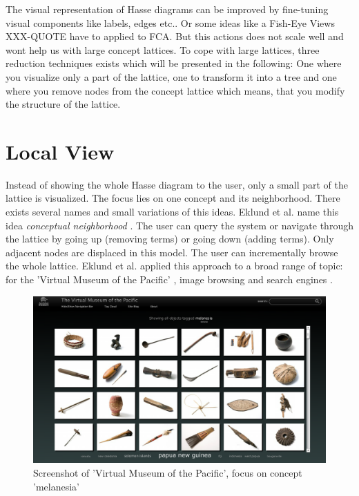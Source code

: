 \documentclass[11pt]{report}
\begin{document}
The visual representation of Hasse diagrams can be improved by fine-tuning visual components like labels, edges etc.. Or some ideas like a Fish-Eye Views XXX-QUOTE have to applied to FCA. But this actions does not scale well and wont help us with large concept lattices. To cope with large lattices, three reduction techniques exists which will be presented in the following: One where you visualize only a part of the lattice, one to transform it into a tree and one where you remove nodes from the concept lattice which means, that you modify the structure of the lattice.

\section{Local View}

Instead of showing the whole Hasse diagram to the user, only a small part of the lattice is visualized. The focus lies on one concept and its neighborhood. There exists several names and small variations of this ideas. Eklund et al. name this idea \textit{conceptual neighborhood} \cite{Eklund2009,Eklund2012}. The user can query the system or navigate through the lattice by going up (removing terms) or going down (adding terms). Only adjacent nodes are displaced in this model. The user can incrementally browse the whole lattice. Eklund et al. applied this approach to a broad range of topic: for the 'Virtual Museum of the Pacific' \cite{Eklund2009,Eklund2012}, image browsing \cite{Ducrou2006,Ducrou2008} and search engines \cite{Dau2008}.

\begin{figure}[h]
\label{figure:pacific}
	\centering
	\includegraphics[width=\linewidth]{images/pacific}
\caption{Screenshot of 'Virtual Museum of the Pacific', focus on concept 'melanesia'}
\end{figure}
\end{document}
